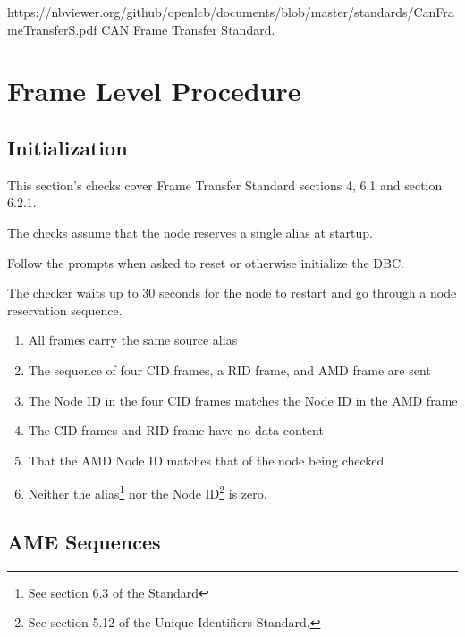 



\maketitle
\thispagestyle{firststyle}

\introductionCaveats
    {https://nbviewer.org/github/openlcb/documents/blob/master/standards/CanFrameTransferS.pdf}
    {CAN Frame Transfer Standard}.

\section{Frame Level Procedure}


\subsection{Initialization}

This section's checks cover Frame Transfer Standard sections 4, 6.1 and section 6.2.1.

The checks assume that the node reserves a single alias at startup.

Follow the prompts when asked to reset or otherwise initialize the DBC.

The checker waits up to 30 seconds for the node to restart and 
go through a node reservation sequence.

\begin{enumerate}
\item All frames carry the same source alias
\item The sequence of four CID frames, a RID frame, and AMD frame are sent
\item The Node ID in the four CID frames matches the Node ID in the AMD frame
\item The CID frames and RID frame have no data content
\item That the AMD Node ID matches that of the node being checked
\item Neither the alias\footnote{See section 6.3 of the Standard} 
nor the Node ID\footnote{See section 5.12 of the Unique Identifiers Standard.}
is zero.
\end{enumerate}


\subsection{AME Sequences}

